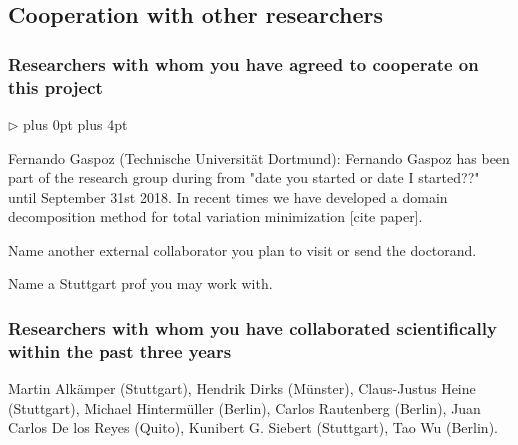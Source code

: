 \documentclass[enabledeprecatedfontcommands,cleardoublepage=empty,headsepline,twoside,11pt,DIV=15,BCOR=12mm,final]{scrartcl}
\renewenvironment{itemize}
{\begin{list}{$\triangleright$}{\labelwidth-2mm \leftmargin3mm %
  \itemsep5pt plus 0pt  \topsep3pt \parsep1pt plus 4pt \labelsep2mm}}
{\end{list}}
\newcommand{\ppdes}{\textsf{pPDEs}\xspace}
\begin{document}
\subsection{Cooperation with other researchers}
\label{sec:coop-with-other}


\subsubsection{Researchers with whom you have agreed to cooperate on this project}
\label{sec:rese-with-whom}
\begin{itemize}
\item Fernando Gaspoz (Technische Universit\"at Dortmund): Fernando Gaspoz has been
part of the research group during from "date you started or date I started??" until
September 31st 2018. In recent times we have developed a domain decomposition method for total variation minimization [cite paper].
\item Name another external collaborator you plan to visit or send the doctorand.
\item Name a Stuttgart prof you may work with.
\end{itemize}


\subsubsection{Researchers with whom you have collaborated scientifically within the past three years}
\label{sec:rese-with-whom-1}
Martin Alk\"amper (Stuttgart), Hendrik Dirks (M\"unster), Claus-Justus Heine (Stuttgart), Michael Hinterm\"uller (Berlin), %
 Carlos Rautenberg (Berlin), Juan Carlos De los Reyes (Quito), Kunibert G. Siebert (Stuttgart), Tao Wu (Berlin). %

\end{document}

